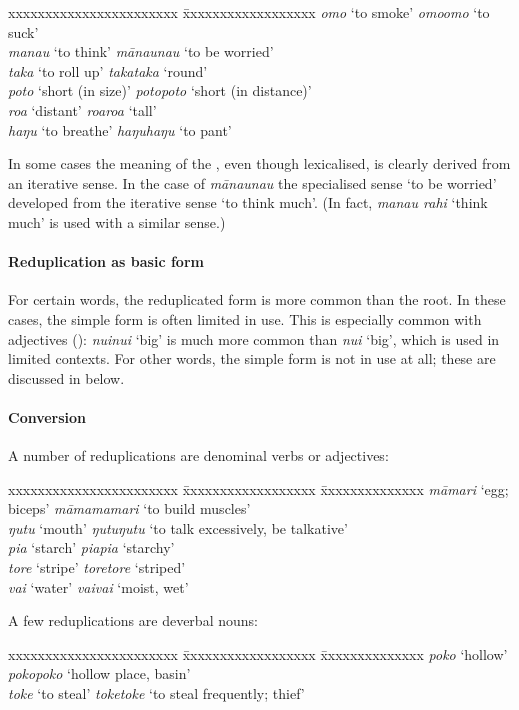 \ea
\begin{tabbing}
xxxxxxxxxxxxxxxxxxxxxxx \= xxxxxxxxxxxxxxxxxx\kill
  \textit{{\ꞌ}omo} ‘to smoke’ \> \textit{{\ꞌ}omo{\ꞌ}omo} ‘to suck’\\
  \textit{mana{\ꞌ}u} ‘to think’ \> \textit{māna{\ꞌ}una{\ꞌ}u} ‘to be worried’\\
  \textit{taka} ‘to roll up’ \> \textit{takataka} ‘round’\\
  \textit{poto} ‘short (in size)’ \>  \textit{potopoto} ‘short (in distance)’\\
  \textit{roa} ‘distant’ \> \textit{roaroa} ‘tall’\\
  \textit{haŋu} ‘to breathe’ \> \textit{haŋuhaŋu} ‘to pant’
\end{tabbing}
\z 
In some cases the meaning of the , even though lexicalised, is clearly derived from an iterative sense. In the case of \textit{māna{\ꞌ}una{\ꞌ}u} the specialised sense ‘to be worried’ developed from the iterative sense ‘to think much’. (In fact, \textit{mana{\ꞌ}u rahi} ‘think much’ is used with a similar sense.)

\paragraph{Reduplication as basic form}\label{sec:2.6.2.2.5} For certain words, the reduplicated form is more common than the root. In these cases, the simple form is often limited in use. This is especially common with adjectives (): \textit{nuinui} ‘big’ is much more common than \textit{nui} ‘big’, which is used in limited contexts. For other words, the simple form is not in use at all; these are discussed in  below. 

\paragraph{Conversion}\label{sec:2.6.2.2.6} A number of reduplications are denominal verbs or adjectives:

\ea 
\begin{tabbing}
 xxxxxxxxxxxxxxxxxxxxxxx \= xxxxxxxxxxxxxxxxxx \= xxxxxxxxxxxxxx \kill
  \textit{māmari} ‘egg; biceps’ \> \textit{māmamamari} ‘to build muscles’\\
  \textit{ŋutu} ‘mouth’ \> \textit{ŋutuŋutu} ‘to talk excessively, be talkative’\\
  \textit{pia} ‘starch’  \>\textit{piapia} ‘starchy’\\
  \textit{tore} ‘stripe’ \> \textit{toretore} ‘striped’\\
  \textit{vai} ‘water’ \> \textit{vaivai} ‘moist, wet’
\end{tabbing}
\z 
A few reduplications are deverbal nouns:
\ea
\begin{tabbing}
 xxxxxxxxxxxxxxxxxxxxxxx \= xxxxxxxxxxxxxxxxxx \= xxxxxxxxxxxxxx \kill
  \textit{poko} ‘hollow’  \>\textit{pokopoko} ‘hollow place, basin’\\
  \textit{toke} ‘to steal’ \> \textit{toketoke} ‘to steal frequently; thief’
\end{tabbing}
\z 
